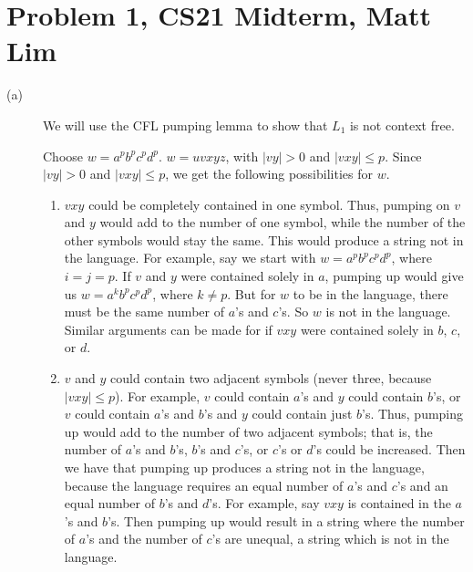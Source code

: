 \documentclass{article}
\begin{document}



\section*{Problem 1, CS21 Midterm, Matt Lim}
\begin{description}
    \item[(a)] We will use the CFL pumping lemma to show that $L_{1}$ is
        not context free.

        Choose $w = a^{p}b^{p}c^{p}d^{p}$. $w = uvxyz$, with $|vy| > 0$ and
        $|vxy| \leq p$. Since $|vy| > 0$ and $|vxy| \leq p$, we get
        the following possibilities for $w$.

        \begin{enumerate}
            \item $vxy$ could be completely contained in one symbol. Thus,
                pumping on $v$ and $y$ would add to the number of one symbol,
                while the number of the other symbols would stay the same. This
                would produce a string not in the language. For example,
                say we start with $w = a^{p}b^{p}c^{p}d^{p}$, where $i = j = p$.
                If $v$ and $y$ were contained solely in $a$, pumping up would
                give us $w = a^{k}b^{p}c^{p}d^{p}$, where $k \neq p$. But
                for $w$ to be in the language, there must be the same number
                of $a$'s and $c$'s. So $w$ is not in the language. Similar
                arguments can be made for if $vxy$ were contained solely in
                $b$, $c$, or $d$.
            \item $v$ and $y$ could contain two adjacent symbols (never three,
                because $|vxy| \leq p$). For example, $v$ could contain $a$'s
                and $y$ could contain $b$'s, or $v$ could contain $a$'s and
                $b$'s and $y$ could contain just $b$'s.
                Thus, pumping up would add to the number
                of two adjacent symbols; that is, the number of $a$'s and $b$'s,
                $b$'s and $c$'s, or $c$'s or $d$'s could be increased. Then we
                have that pumping up
                produces a string not in the language, because the language
                requires an equal number of $a$'s and $c$'s and an equal number
                of $b$'s and $d$'s. For example, say $vxy$ is contained in the
                $a$'s and $b$'s. Then pumping up would result in a string
                where the number of $a$'s and the number of $c$'s are unequal,
                a string which is not in the language.
        \end{enumerate}


\end{description}
\end{document}

